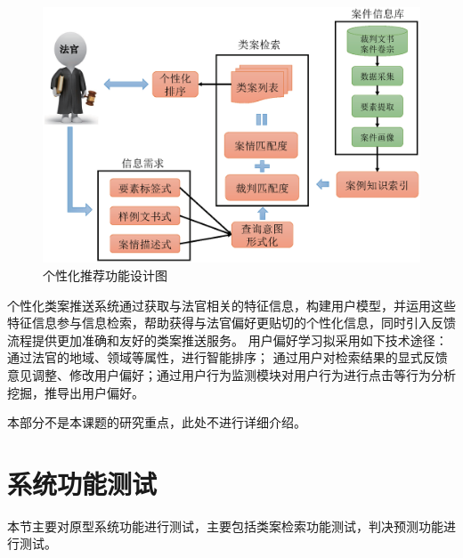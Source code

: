 \begin{figure}[htbp]%
    \centering
    \includegraphics[scale=0.5, clip=true]{./sources/sys_recomm.eps}
    \caption{\label{fig:sys_recomm}个性化推荐功能设计图}
\end{figure}


个性化类案推送系统通过获取与法官相关的特征信息，构建用户模型，并运用这些特征信息参与信息检索，帮助获得与法官偏好更贴切的个性化信息，同时引入反馈流程提供更加准确和友好的类案推送服务。 用户偏好学习拟采用如下技术途径： 通过法官的地域、领域等属性，进行智能排序； 通过用户对检索结果的显式反馈意见调整、修改用户偏好；通过用户行为监测模块对用户行为进行点击等行为分析挖掘，推导出用户偏好。

本部分不是本课题的研究重点，此处不进行详细介绍。



\section{系统功能测试}
本节主要对原型系统功能进行测试，主要包括类案检索功能测试，判决预测功能进行测试。
